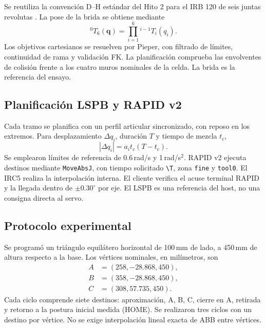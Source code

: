 \documentclass[conference]{IEEEtran}
\begin{document}
Se reutiliza la convención D--H estándar del Hito 2 para el IRB 120 de seis juntas revolutas \cite{abb}. La pose de la brida se obtiene mediante
\begin{equation}
{}^{0}\!T_6(\bm q)=\prod_{i=1}^{6}{}^{i-1}\!T_i(q_i).
\end{equation}
Los objetivos cartesianos se resuelven por Pieper, con filtrado de límites, continuidad de rama y validación FK. La planificación comprueba las envolventes de colisión frente a los cuatro muros nominales de la celda. La brida es la referencia del ensayo.
\subsection{Planificación LSPB y RAPID v2}
Cada tramo se planifica con un perfil articular sincronizado, con reposo en los extremos. Para desplazamiento $\Delta q_i$, duración $T$ y tiempo de mezcla $t_c$,
\begin{equation}
|\Delta q_i|=a_i t_c(T-t_c).
\end{equation}
Se emplearon límites de referencia de 0.6\,rad/s y 1\,rad/s$^2$. RAPID v2 ejecuta destinos mediante \texttt{MoveAbsJ}, con tiempo solicitado \texttt{\textbackslash T}, zona \texttt{fine} y \texttt{tool0}. El IRC5 realiza la interpolación interna. El cliente verifica el acuse terminal RAPID y la llegada dentro de $\pm0.30^\circ$ por eje. El LSPB es una referencia del host, no una consigna directa al servo.
\subsection{Protocolo experimental}
Se programó un triángulo equilátero horizontal de 100\,mm de lado, a 450\,mm de altura respecto a la base. Los vértices nominales, en milímetros, son
\begin{align*}
 A&=(258,-28.868,450),\\
 B&=(358,-28.868,450),\\
 C&=(308,57.735,450).
\end{align*}
Cada ciclo comprende siete destinos: aproximación, A, B, C, cierre en A, retirada y retorno a la postura inicial medida (HOME). Se realizaron tres ciclos con un destino por vértice. No se exige interpolación lineal exacta de ABB entre vértices.
\end{document}
